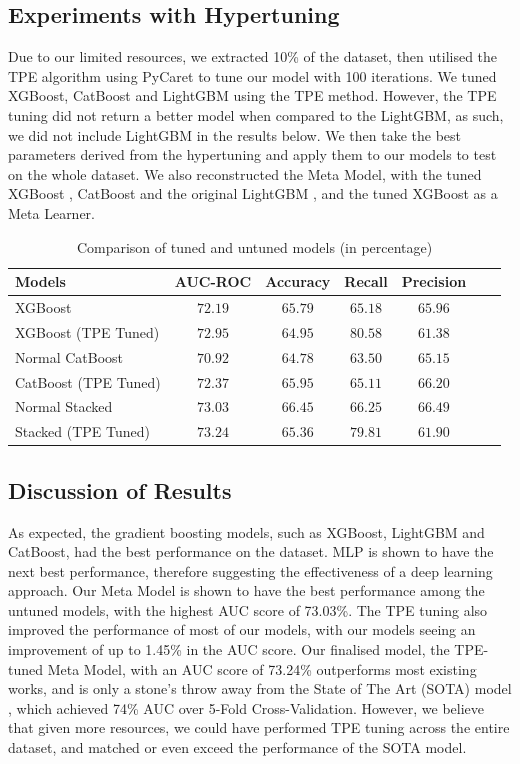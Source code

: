 \documentclass[runningheads]{llncs}
\begin{document}
\subsection{Experiments with Hypertuning}
Due to our limited resources, we extracted 10\% of the dataset, then utilised the TPE algorithm using PyCaret \cite{pycaret} to tune our model with 100 iterations. We tuned XGBoost, CatBoost and LightGBM using the TPE method. However, the TPE tuning did not return a better model when compared to the LightGBM, as such, we did not include LightGBM in the results below. We then take the best parameters derived from the hypertuning and apply them to our models to test on the whole dataset. We also reconstructed the Meta Model, with the tuned XGBoost \cite{Chen:2016:XST:2939672.2939785}, CatBoost \cite{cat} and the original LightGBM \cite{ke2017lightgbm}, and the tuned XGBoost as a Meta Learner. 
\begin{table}
\centering
\caption{Comparison of tuned and untuned models (in percentage)}
\label{tab:allaimodels}
\begin{tabular}{@{}lcccccc@{}}
\toprule %
 {\bf Models} & {\bf AUC-ROC} & {\bf Accuracy} & {\bf Recall} & {\bf Precision} \\ \midrule %
XGBoost & $72.19$ & $65.79$ & $65.18$ & $65.96$ \\ %
 XGBoost (TPE Tuned) & $72.95$ & $64.95$ & $\mathbf{80.58}$ & $61.38$ \\ \hline
Normal CatBoost & $70.92$ & $64.78$ & $63.50$ & $65.15$ \\ %
 CatBoost (TPE Tuned) & $72.37$ & $65.95$ & $65.11$ & $66.20$ \\ \hline
 Normal Stacked & $73.03$ & $\mathbf{66.45}$ & $66.25$ & $\mathbf{66.49}$ \\ %
 Stacked (TPE Tuned) & $\mathbf{73.24}$ & $65.36$ & $79.81$ & $61.90$ \\ \bottomrule %
\end{tabular}%
\vspace{-2ex}
\end{table}

\subsection{Discussion of Results}
As expected, the gradient boosting models, such as XGBoost, LightGBM and CatBoost, had the best performance on the dataset. MLP is shown to have the next best performance, therefore suggesting the effectiveness of a deep learning approach. Our Meta Model is shown to have the best performance among the untuned models, with the highest AUC score of 73.03\%. The TPE tuning also improved the performance of most of our models, with our models seeing an improvement of up to 1.45\% in the AUC score. Our finalised model, the TPE-tuned Meta Model, with an AUC score of 73.24\% outperforms most existing works, and is only a stone's throw away from the State of The Art (SOTA) model \cite{shahini2019}, which achieved 74\% AUC over 5-Fold Cross-Validation. However, we believe that given more resources, we could have performed TPE tuning across the entire dataset, and matched or even exceed the performance of the SOTA model. 
\end{document}
